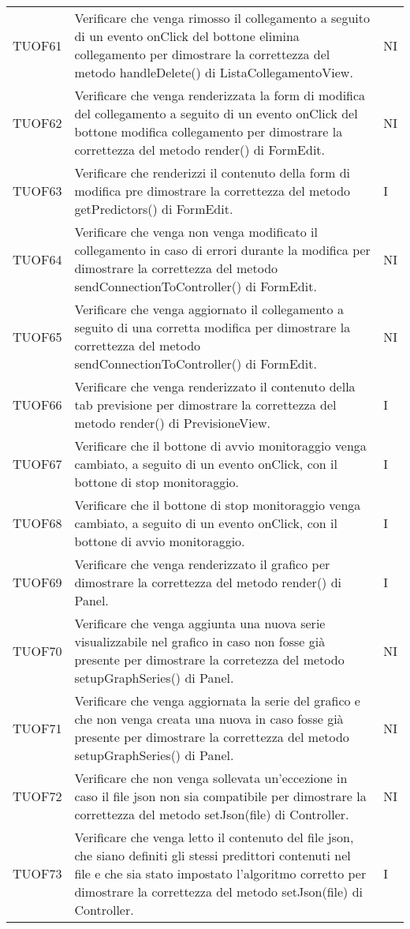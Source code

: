 \begin{longtable}{C{2cm} L{8cm} C{2cm}}
TUOF61 & Verificare che venga rimosso il collegamento a seguito di un evento onClick del bottone elimina collegamento per dimostrare la correttezza del metodo handleDelete() di ListaCollegamentoView. & NI \\
TUOF62 & Verificare che venga renderizzata la form di modifica del collegamento a seguito di un evento onClick del bottone modifica collegamento per dimostrare la correttezza del metodo render() di FormEdit. & NI \\
TUOF63 & Verificare che renderizzi il contenuto della form di modifica pre dimostrare la correttezza del metodo getPredictors() di FormEdit. & I \\
TUOF64 & Verificare che venga non venga modificato il collegamento in caso di errori durante la modifica per dimostrare la correttezza del metodo sendConnectionToController() di FormEdit. & NI \\
TUOF65 & Verificare che venga aggiornato il collegamento a seguito di una corretta modifica per dimostrare la correttezza del metodo sendConnectionToController() di FormEdit. & NI \\
TUOF66 & Verificare che venga renderizzato il contenuto della tab previsione per dimostrare la correttezza del metodo render() di PrevisioneView. & I \\
TUOF67 & Verificare che il bottone di avvio monitoraggio venga cambiato, a seguito di un evento onClick, con il bottone di stop monitoraggio. & I \\
TUOF68 & Verificare che il bottone di stop monitoraggio venga cambiato, a seguito di un evento onClick, con il bottone di avvio monitoraggio. & I \\
TUOF69 & Verificare che venga renderizzato il grafico per dimostrare la correttezza del metodo render() di Panel. & I \\
TUOF70 & Verificare che venga aggiunta una nuova serie visualizzabile nel grafico in caso non fosse già presente per dimostrare la corretezza del metodo setupGraphSeries() di Panel. & NI \\
TUOF71 & Verificare che venga aggiornata la serie del grafico e che non venga creata una nuova in caso fosse già presente per dimostrare la correttezza del metodo setupGraphSeries() di Panel. & NI \\
TUOF72 & Verificare che non venga sollevata un'eccezione in caso il file json non sia compatibile per dimostrare la correttezza del metodo setJson(file) di Controller. & NI \\
TUOF73 & Verificare che venga letto il contenuto del file json, che siano definiti gli stessi predittori contenuti nel file e che sia stato impostato l'algoritmo corretto per dimostrare la correttezza del metodo setJson(file) di Controller. & I \\

\end{longtable}
